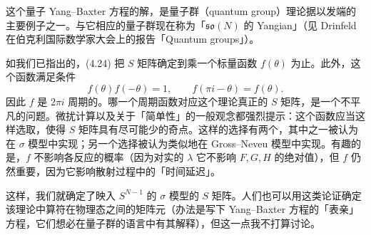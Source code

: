 
这个量子 Yang–Baxter 方程的解，是量子群（quantum group）理论据以发端的主要例子之一。与它相应的量子群现在称为「$\mathfrak{so}(N)$ 的 Yangian」（见 Drinfeld 在伯克利国际数学家大会上的报告「Quantum groups」）。

如我们已指出的，(4.24) 把 $S$ 矩阵确定到乘一个标量函数 $f(\theta)$ 为止。此外，这个函数满足条件
\[
f(\theta)f(-\theta)=1,\qquad f(\pi i-\theta)=f(\theta).
\]
因此 $f$ 是 $2\pi i$ 周期的。哪一个周期函数对应这个理论真正的 $S$ 矩阵，是一个不平凡的问题。微扰计算以及关于「简单性」的一般观念都强烈提示：这个函数应当这样选取，使得 $S$ 矩阵具有尽可能少的奇点。这样的选择有两个，其中之一被认为在 $\sigma$ 模型中实现；另一个选择被认为类似地在 Gross–Neveu 模型中实现。有趣的是，$f$ 不影响各反应的概率（因为对实的 $\lambda$ 它不影响 $F,G,H$ 的绝对值），但 $f$ 仍然重要，因为它影响散射过程中的「时间延迟」。

这样，我们就确定了映入 $S^{N-1}$ 的 $\sigma$ 模型的 $S$ 矩阵。人们也可以用这类论证确定该理论中算符在物理态之间的矩阵元（办法是写下 Yang–Baxter 方程的「表亲」方程，它们想必在量子群的语言中有其解释），但这一点我不打算讨论。


